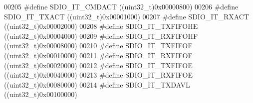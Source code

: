 \begin{DoxyCode}
00205 \textcolor{preprocessor}{#}\textcolor{preprocessor}{define} \textcolor{preprocessor}{SDIO\_IT\_CMDACT}                      \textcolor{preprocessor}{(}\textcolor{preprocessor}{(}\textcolor{preprocessor}{uint32\_t}\textcolor{preprocessor}{)}0x00000800\textcolor{preprocessor}{)}
00206 \textcolor{preprocessor}{#}\textcolor{preprocessor}{define} \textcolor{preprocessor}{SDIO\_IT\_TXACT}                       \textcolor{preprocessor}{(}\textcolor{preprocessor}{(}\textcolor{preprocessor}{uint32\_t}\textcolor{preprocessor}{)}0x00001000\textcolor{preprocessor}{)}
00207 \textcolor{preprocessor}{#}\textcolor{preprocessor}{define} \textcolor{preprocessor}{SDIO\_IT\_RXACT}                       \textcolor{preprocessor}{(}\textcolor{preprocessor}{(}\textcolor{preprocessor}{uint32\_t}\textcolor{preprocessor}{)}0x00002000\textcolor{preprocessor}{)}
00208 \textcolor{preprocessor}{#}\textcolor{preprocessor}{define} \textcolor{preprocessor}{SDIO\_IT\_TXFIFOHE}                    \textcolor{preprocessor}{(}\textcolor{preprocessor}{(}\textcolor{preprocessor}{uint32\_t}\textcolor{preprocessor}{)}0x00004000\textcolor{preprocessor}{)}
00209 \textcolor{preprocessor}{#}\textcolor{preprocessor}{define} \textcolor{preprocessor}{SDIO\_IT\_RXFIFOHF}                    \textcolor{preprocessor}{(}\textcolor{preprocessor}{(}\textcolor{preprocessor}{uint32\_t}\textcolor{preprocessor}{)}0x00008000\textcolor{preprocessor}{)}
00210 \textcolor{preprocessor}{#}\textcolor{preprocessor}{define} \textcolor{preprocessor}{SDIO\_IT\_TXFIFOF}                     \textcolor{preprocessor}{(}\textcolor{preprocessor}{(}\textcolor{preprocessor}{uint32\_t}\textcolor{preprocessor}{)}0x00010000\textcolor{preprocessor}{)}
00211 \textcolor{preprocessor}{#}\textcolor{preprocessor}{define} \textcolor{preprocessor}{SDIO\_IT\_RXFIFOF}                     \textcolor{preprocessor}{(}\textcolor{preprocessor}{(}\textcolor{preprocessor}{uint32\_t}\textcolor{preprocessor}{)}0x00020000\textcolor{preprocessor}{)}
00212 \textcolor{preprocessor}{#}\textcolor{preprocessor}{define} \textcolor{preprocessor}{SDIO\_IT\_TXFIFOE}                     \textcolor{preprocessor}{(}\textcolor{preprocessor}{(}\textcolor{preprocessor}{uint32\_t}\textcolor{preprocessor}{)}0x00040000\textcolor{preprocessor}{)}
00213 \textcolor{preprocessor}{#}\textcolor{preprocessor}{define} \textcolor{preprocessor}{SDIO\_IT\_RXFIFOE}                     \textcolor{preprocessor}{(}\textcolor{preprocessor}{(}\textcolor{preprocessor}{uint32\_t}\textcolor{preprocessor}{)}0x00080000\textcolor{preprocessor}{)}
00214 \textcolor{preprocessor}{#}\textcolor{preprocessor}{define} \textcolor{preprocessor}{SDIO\_IT\_TXDAVL}                      \textcolor{preprocessor}{(}\textcolor{preprocessor}{(}\textcolor{preprocessor}{uint32\_t}\textcolor{preprocessor}{)}0x00100000\textcolor{preprocessor}{)}

\end{DoxyCode}

